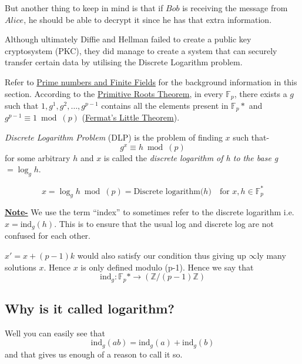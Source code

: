 		\quad But another thing to keep in mind is that if \(Bob\) is receiving the message from \(Alice\), he should be able to decrypt it since he has that extra information. \par

		Although ultimately Diffie and Hellman failed to create a public key cryptosystem (PKC), they did manage to create a system that can securely transfer certain data by utilising the Discrete Logarithm problem.

		Refer to \textcolor{teal}{\hyperref[sec:prime]{Prime numbers and Finite Fields}} for the background information in this section. According to the \textcolor{teal}{\hyperref[subsec:primitive]{Primitive Roots Theorem}}, in every \(\mathbb{F}_p\), there exists a \(g\) such that \(1, g^1, g^2, \ldots , g^{p-1}\) contains all the elements present in \(\mathbb{F}_p*\) and \(g^{p-1}\equiv 1 \bmod(p)\) (\textcolor{teal}{\hyperref[sec:fermat]{Fermat's Little Theorem}}).\par
		\emph{Discrete Logarithm Problem} (DLP) is the problem of finding \(x\) such that- \[g^x \equiv h \bmod(p)\] for some arbitrary \(h\) and \(x\) is called the \emph{discrete logarithm of h to the base g} \(= \log_g{h}\).\par
		\begin{mybox}
			\[x= \log_g{h} \bmod(p)= \text{Discrete logarithm(} h \text{)} \quad \text{for } x, h \in \mathbb{F}_p^*\]
		\end{mybox}
		\begin{tcolorbox}
			\textbf{\underline{Note-}} We use the term ``index'' to sometimes refer to the discrete logarithm i.e. \(x=\text{ind}_g{(h)}\). This is to ensure that the usual log and discrete log are not confused for each other.
		\end{tcolorbox}
		\(x' = x + (p-1) k \) would also satisfy our condition thus giving up \(\infty\)ly many solutions $x$. Hence \(x\) is only defined modulo (p-1). Hence we say that \[\text{ind}_g : \mathbb{F}_p* \rightarrow (\mathbb{Z}/(p-1)\mathbb{Z})\]
		\subsection{Why is it called logarithm?}
		Well you can easily see that \[\text{ind}_g (ab)=\text{ind}_g (a)+\text{ind}_g (b)\] and that gives us enough of a reason to call it so.

